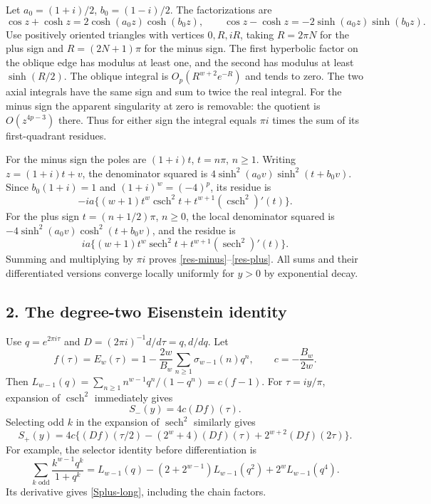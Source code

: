 \documentclass[11pt]{article}
\newcommand{\sech}{\operatorname{sech}}
\newcommand{\csch}{\operatorname{csch}}
\begin{document}
Let $a_0=(1+i)/2$, $b_0=(1-i)/2$. The factorizations are
\[
 \cos z+\cosh z=2\cosh(a_0z)\cosh(b_0z),\qquad
 \cos z-\cosh z=-2\sinh(a_0z)\sinh(b_0z).
\]
Use positively oriented triangles with vertices $0,R,iR$, taking
$R=2\pi N$ for the plus sign and $R=(2N+1)\pi$ for the minus sign.
The first hyperbolic factor on the oblique edge has modulus at least
one, and the second has modulus at least $\sinh(R/2)$. The oblique
integral is $O_p(R^{w+2}e^{-R})$ and tends to zero. The two axial
integrals have the same sign and sum to twice the real integral.
For the minus sign the apparent singularity at zero is removable:
the quotient is $O(z^{4p-3})$ there. Thus for either sign
the integral equals $\pi i$ times the sum of its first-quadrant residues.

For the minus sign the poles are $(1+i)t$, $t=n\pi$, $n\ge1$.
Writing $z=(1+i)t+v$, the denominator squared is
$4\sinh^2(a_0v)\sinh^2(t+b_0v)$. Since
$b_0(1+i)=1$ and $(1+i)^w=(-4)^p$, its residue is
\[
 -ia\{(w+1)t^w\csch^2t+t^{w+1}(\csch^2)'(t)\}.
\]
For the plus sign $t=(n+1/2)\pi$, $n\ge0$, the local denominator
squared is $-4\sinh^2(a_0v)\cosh^2(t+b_0v)$, and the residue is
\[
 ia\{(w+1)t^w\sech^2t+t^{w+1}(\sech^2)'(t)\}.
\]
Summing and multiplying by $\pi i$ proves
\eqref{res-minus}--\eqref{res-plus}. All sums and their differentiated
versions converge locally uniformly for $y>0$ by exponential decay.

\subsection*{2. The degree-two Eisenstein identity}
Use $q=e^{2\pi i\tau}$ and $D=(2\pi i)^{-1}d/d\tau=q,d/dq$.
Let
\[
 f(\tau)=E_w(\tau)=1-\frac{2w}{B_w}
                    \sum_{n\ge1}\sigma_{w-1}(n)q^n,
 \qquad c=-\frac{B_w}{2w}.
\]
Then $L_{w-1}(q)=\sum_{n\ge1}n^{w-1}q^n/(1-q^n)=c(f-1)$.
For $\tau=iy/\pi$, expansion of $\csch^2$ immediately gives
\begin{equation}\label{Sminus}
 S_-(y)=4c(Df)(\tau).
\end{equation}
Selecting odd $k$ in the expansion of $\sech^2$ similarly gives
\begin{equation}\label{Splus-long}
 S_+(y)=4c\{(Df)(\tau/2)
       -(2^w+4)(Df)(\tau)+2^{w+2}(Df)(2\tau)\}.
\end{equation}
For example, the selector identity before differentiation is
\[
 \sum_{k\text{ odd}}\frac{k^{w-1}q^k}{1+q^k}
 =L_{w-1}(q)-(2+2^{w-1})L_{w-1}(q^2)+2^wL_{w-1}(q^4).
\]
Its derivative gives \eqref{Splus-long}, including the chain factors.
\end{document}
